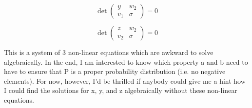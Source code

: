 \begin{equation}
  \label{eq:r4}
  \det\left(
    \begin{array}{rr}
      y & w_{2} \\
      v_{1} & \sigma
    \end{array}
\right)=0
\end{equation}

\begin{equation}
  \label{eq:r4}
  \det\left(
    \begin{array}{rr}
      z & w_{2} \\
      v_{2} & \sigma
    \end{array}
\right)=0
\end{equation}

This is a system of 3 non-linear equations which are awkward to solve
algebraically. In the end, I am interested to know which property a
and b need to have to ensure that P is a proper probability
distribution (i.e. no negative elements). For now, however, I'd be
thrilled if anybody could give me a hint how I could find the
solutions for x, y, and z algebraically without these non-linear
equations.

